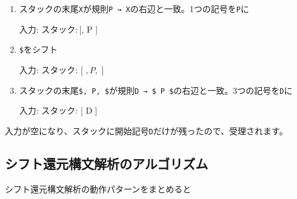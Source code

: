 \begin{enumerate}
\begin{codescreen}{}
入力: $
スタック: [ $, X ]
\end{codescreen}

\item
  スタックの末尾\texttt{X}が規則\texttt{P\ →\ X}の右辺と一致。1つの記号を\texttt{P}に

\begin{codescreen}{}
入力: $
スタック: [ $, P ]
\end{codescreen}

\item
  \texttt{\$}をシフト

\begin{codescreen}{}
入力:
スタック: [ $, P, $ ]
\end{codescreen}

\item
  スタックの末尾\texttt{\$,\ P,\ \$}が規則\texttt{D\ →\ \$\ P\ \$}の右辺と一致。3つの記号を\texttt{D}に

\begin{codescreen}{}
入力:
スタック: [ D ]
\end{codescreen}
\end{enumerate}

入力が空になり、スタックに開始記号\texttt{D}だけが残ったので、受理されます。

\subsection{シフト還元構文解析のアルゴリズム}

シフト還元構文解析の動作パターンをまとめると

